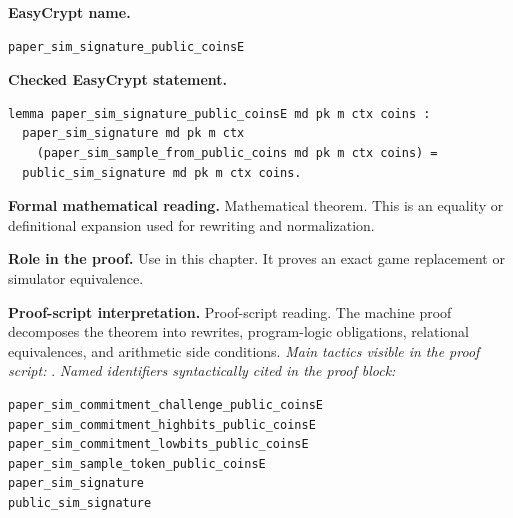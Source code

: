 \begin{formaltheorem}
\noindent\textbf{EasyCrypt name.}
\begin{lstlisting}[language=EasyCrypt,basicstyle=\ttfamily\scriptsize]
paper_sim_signature_public_coinsE
\end{lstlisting}
\noindent\textbf{Checked EasyCrypt statement.}
\begin{lstlisting}[language=EasyCrypt,basicstyle=\ttfamily\scriptsize]
lemma paper_sim_signature_public_coinsE md pk m ctx coins :
  paper_sim_signature md pk m ctx
    (paper_sim_sample_from_public_coins md pk m ctx coins) =
  public_sim_signature md pk m ctx coins.
\end{lstlisting}
\noindent\textbf{Formal mathematical reading.}
Mathematical theorem. This is an equality or definitional expansion used for rewriting and normalization.

\noindent\textbf{Role in the proof.}
Use in this chapter. It proves an exact game replacement or simulator equivalence.

\noindent\textbf{Proof-script interpretation.}
Proof-script reading. The machine proof decomposes the theorem into rewrites, program-logic obligations, relational equivalences, and arithmetic side conditions.
\emph{Main tactics visible in the proof script:} .
\emph{Named identifiers syntactically cited in the proof block:}
\begin{lstlisting}[language=EasyCrypt,basicstyle=\ttfamily\scriptsize]
paper_sim_commitment_challenge_public_coinsE
paper_sim_commitment_highbits_public_coinsE
paper_sim_commitment_lowbits_public_coinsE
paper_sim_sample_token_public_coinsE
paper_sim_signature
public_sim_signature
\end{lstlisting}

\end{formaltheorem}


